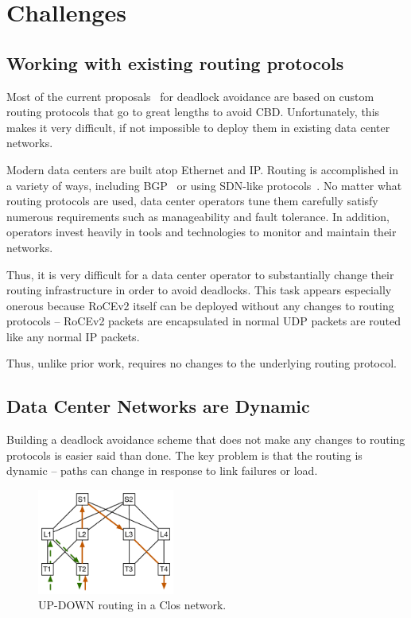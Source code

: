 \section{Challenges}
\label{sec:challenges}

\subsection{Working with existing routing protocols}
\label{sec:incremental}

Most of the current proposals~\cite{tcpbolt, karol2003prevention,
sancho2004,lash,wu2003fault} for deadlock avoidance are based on custom routing
protocols that go to great lengths to avoid CBD.  Unfortunately, this makes it
very difficult, if not impossible to deploy them in existing data center
networks. 

Modern data centers are built atop Ethernet and IP. Routing is accomplished in a
variety of ways, including BGP~\cite{vl2, facebookrouting} or using SDN-like
protocols~\cite{singh2015jupiter}.  No matter what routing protocols are used,
data center operators tune them carefully satisfy numerous requirements such as
manageability and fault tolerance.  In addition, operators invest heavily in
tools and technologies to monitor and maintain their networks.

Thus, it is very difficult for a data center operator to substantially change their routing
infrastructure in order to avoid deadlocks. This task appears especially
onerous because RoCEv2 itself can be deployed without any changes to routing
protocols -- RoCEv2 packets are encapsulated in normal UDP packets are routed
like any normal IP packets.

Thus, unlike prior work, \sysname{} requires no changes to the underlying routing
protocol.

\subsection{Data Center Networks are Dynamic}\label{sec:reroute}

Building a deadlock avoidance scheme that does not make any changes to routing
protocols is easier said than done. The key problem is that the routing is
dynamic -- paths can change in response to link failures or load.

\begin{figure}
	\centering
	\includegraphics[width=0.4\textwidth] {figs/up-down}
	\caption{UP-DOWN routing in a Clos network.}\label{fig:up-down}
\end{figure}


